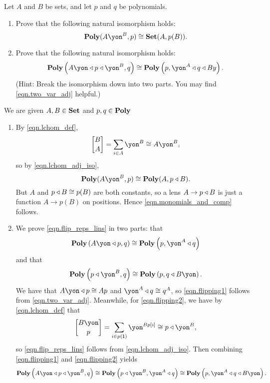 \documentclass[Book-Poly]{subfiles}
\begin{document}
\begin{exercise}
Let $A$ and $B$ be sets, and let $p$ and $q$ be polynomials.
\begin{enumerate}
    \item Prove that the following natural isomorphism holds:
    \begin{equation}\label{eqn.monomials_and_comp}
    	\poly(A\yon^B,p)\iso\smset(A,p(B)).
    \end{equation}

    \item Prove that the following natural isomorphism holds:
    \begin{equation}\label{eqn.flip_reps_lins}
        \poly\left(A\yon\tri p\tri \yon^B, q\right)\iso\poly\left(p,\yon^A\tri q\tri By\right).
    \end{equation}
    (Hint: Break the isomorphism down into two parts.
    You may find \eqref{eqn.two_var_adj} helpful.)
    \qedhere
\end{enumerate}
\begin{solution}
We are given $A,B\in\mathbf{Set}$ and $p,q\in\mathbf{Poly}$
\begin{enumerate}
    \item By \eqref{eqn.lchom_def},
    \[
        \lchom{B}{A}=\sum_{i\in A}\yon^{B}\iso A\yon^B,
    \]
    so by \eqref{eqn.lchom_adj_iso},
    \[
        \poly(A\yon^B,p)\iso\poly(A,p\tri B).
    \]
    But $A$ and $p\mathbin{\triangleleft} B\cong p(B)$ are both constants, so a lens $A\to p\mathbin{\triangleleft} B$ is just a function $A\to p(B)$ on positions.
    Hence \eqref{eqn.monomials_and_comp} follows.

    \item We prove \eqref{eqn.flip_reps_lins} in two parts: that
    \begin{equation} \label{eqn.flipping1}
        \poly\left(A\yon\tri p, q\right)\iso\poly\left(p,\yon^A\tri q\right)
    \end{equation}
    and that
    \begin{equation} \label{eqn.flipping2}
        \poly\left(p \tri \yon^B, q\right)\cong\poly\left(p, q\tri B\yon\right).
    \end{equation}
    We have that $A\yon \tri p \iso Ap$ and $\yon^A \tri q \iso q^A$, so \eqref{eqn.flipping1} follows from \eqref{eqn.two_var_adj}.
    Meanwhile, for \eqref{eqn.flipping2}, we have by \eqref{eqn.lchom_def} that
    \[
        \lchom{B\yon}{p}=\sum_{i\in p(\1)}\yon^{Bp[i]}\iso p\tri\yon^B,
    \]
    so \eqref{eqn.flip_reps_lins} follows from \eqref{eqn.lchom_adj_iso}.
    Then combining \eqref{eqn.flipping1} and \eqref{eqn.flipping2} yields
    \[
        \poly\left(A\yon\tri p\tri\yon^B,q\right)\iso\poly\left(p\tri\yon^B,\yon^A\tri q\right)\iso\poly\left(p,\yon^A\tri q\tri B\yon\right).
    \]
\end{enumerate}
\end{solution}
\end{exercise}
\end{document}
